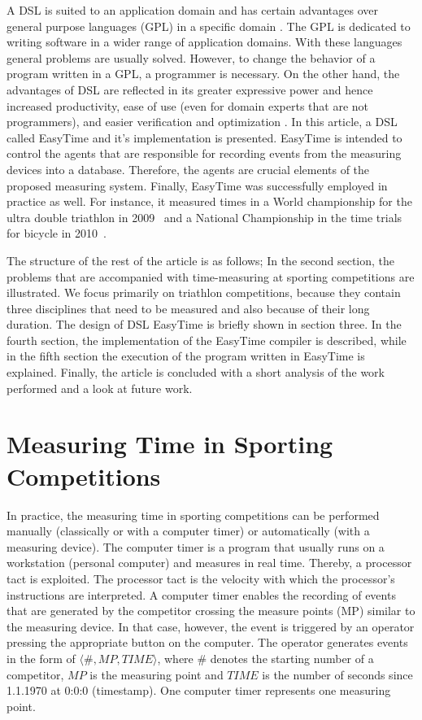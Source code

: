 \documentclass[preprint, prX]{revtex4}
\begin{document}
A DSL is suited to an application domain and has certain advantages over general purpose languages (GPL) in a specific domain
\cite{Kosar:2010,Mernik:2005}. The GPL is dedicated to writing software in a wider range of application domains. With these languages
general problems are usually solved. However, to change the behavior of a program written in a GPL, a programmer is necessary. On the
other hand, the advantages of DSL are reflected in its greater expressive power and hence increased productivity, ease of use (even for domain experts that are not programmers), and easier verification and optimization \cite{Mernik:2005}. In this article, a DSL called EasyTime and it's implementation is presented. EasyTime is intended to control the agents that are responsible for recording events from the measuring devices into a database. Therefore, the agents are crucial elements of the proposed measuring system. Finally,
EasyTime was successfully employed in practice as well. For instance, it measured times in a World championship for the ultra double
triathlon in 2009~\cite{Fister:2011} and a National Championship in the time trials for bicycle in 2010~\cite{Fister:2011}.

The structure of the rest of the article is as follows; In the second section, the problems that are accompanied with time-measuring at sporting competitions are illustrated. We focus primarily on triathlon competitions, because they contain three disciplines that
need to be measured and also because of their long duration. The design of DSL EasyTime is briefly shown in section three. In the fourth section, the implementation of the EasyTime compiler is described, while in the fifth section the execution of the program written in
EasyTime is explained. Finally, the article is concluded with a short analysis of the work performed and a look at future work.

\section{Measuring Time in Sporting Competitions}
In practice, the measuring time in sporting competitions can be performed manually (classically or with a computer timer) or automatically (with a measuring device). The computer timer is a program that usually runs on a workstation (personal computer) and measures in real time. Thereby, a processor tact is exploited. The processor tact is the velocity with which the processor's instructions are interpreted. A computer timer enables the recording of events that are generated by the competitor crossing the measure points (MP) similar to the measuring device. In that case, however, the event is triggered by an operator pressing the appropriate button on the computer. The operator generates events in the form of $\langle\#,MP,TIME\rangle$, where $\#$ denotes the starting number of a competitor, $MP$ is the measuring point and $TIME$ is the number of seconds since 1.1.1970 at 0:0:0 (timestamp). One computer timer represents one measuring point.
\end{document}
